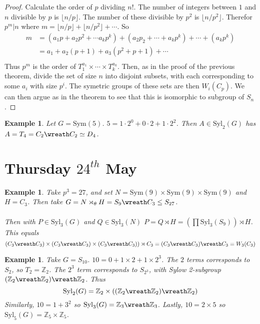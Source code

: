 \documentclass[a4paper,10pt]{article}
\newcommand{\ZZ}{\mathbb{Z}}
\newtheorem{eg}[thm]{Example}
\begin{document}
\begin{proof}
Calculate the order of $p$ dividing $n!$. The number of integers between $1$ and $n$ divisible by $p$ is $\lfloor n / p \rfloor$. The number of these divisible by $p^2$ is $\lfloor n / p^2 \rfloor$. Therefor $p^m | n$ where $m = \lfloor n / p \rfloor + \lfloor n / p^2\rfloor + \cdots$. So
\begin{align*}
 m     &= (a_1 p + a_2 p^2 + \cdots a_k p^k) + (a_2 p_2 + \cdots + a_k p^k) + \cdots + (a_k p^k) \\
       &= a_1 + a_2 ( p + 1) + a_3 ( p^2 + p + 1) + \cdots \\
\end{align*}
Thus $p^m$ is the order of $T_1^{a_1} \times \cdots \times T_k^{a_k}$. Then, as in the proof of the previous theorem, divide the set of size $n$ into disjoint subsets, with each corresponding to some $a_i$ with size $p^i$. The symetric groups of these sets are then $W_i(C_p)$. We can then argue as in the theorem to see that this is isomorphic to  subgroup of $S_n$. 
\end{proof}


\begin{eg}
Let $G = \text{Sym}(5)$. $5 = 1 \cdot 2^0 + 0 \cdot 2 + 1 \cdot 2^2$. Then $A \in \text{Syl}_2(G)$ has $A = T_{4} = C_2 \wreath C_2 \simeq D_4$.  
\end{eg}





\newpage
\section{Thursday $24^{th}$ May}

\begin{eg}
Take $p^3 = 27$, and set $N = \text{Sym}(9) \times \text{Sym}(9) \times \text{Sym}(9)$ and $H = C_3$. Then take $G = N \rtimes_\theta H = S_9 \wreath C_3 \leq S_{27}$. \\
\\
Then with $P \in \text{Syl}_3(G)$ and $Q \in \text{Syl}_3(N)$ $P = Q \rtimes H = \left( \prod \text{Syl}_3(S_9) \right) \rtimes H$. This equals
\[ (C_3 \wreath C_3) \times (C_3 \wreath C_3) \times (C_3 \wreath C_3)) \rtimes C_3 = (C_3 \wreath C_3) \wreath C_3 = W_3 (C_3)\] 
\end{eg}

\begin{eg}
Take $G = S_{10}$. $10 = 0 + 1 \times 2 + 1 \times 2^3$. The $2$ terms corresponds to $S_2$, so $T_2 = \ZZ_2$. The $2^3$ term corresponds to $S_{2^3}$, with Sylow 2-subgroup $(\ZZ_2 \wreath \ZZ_2) \wreath \ZZ_2$. Thus
\[ \text{Syl}_2(G) =  \ZZ_2 \times ((\ZZ_2 \wreath \ZZ_2) \wreath \ZZ_2) \]
Similarly, $10 = 1 + 3^2$ so $\text{Syl}_3(G) = \ZZ_3 \wreath \ZZ_3$. Lastly, $10 = 2 \times 5$ so $\text{Syl}_5(G) = \ZZ_5 \times \ZZ_5$. 
\end{eg}
\end{document}

